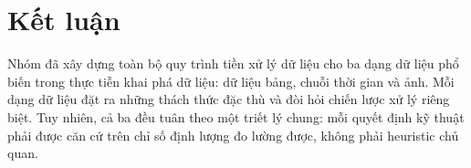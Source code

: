 \section{Kết luận}

Nhóm đã xây dựng toàn bộ quy trình tiền xử lý dữ liệu cho ba dạng dữ liệu phổ biến trong thực tiễn khai phá dữ liệu: dữ liệu bảng, chuỗi thời gian và ảnh. Mỗi dạng dữ liệu đặt ra những thách thức đặc thù và đòi hỏi chiến lược xử lý riêng biệt. Tuy nhiên, cả ba đều tuân theo một triết lý chung: mỗi quyết định kỹ thuật phải được căn cứ trên chỉ số định lượng đo lường được, không phải heuristic chủ quan.